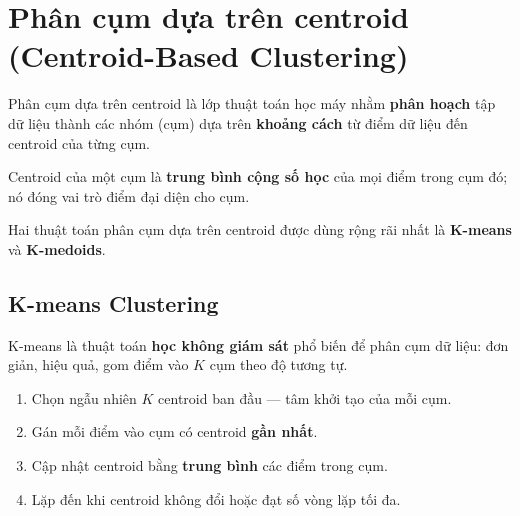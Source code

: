 \section{Phân cụm dựa trên centroid (Centroid-Based Clustering)}
\label{sec:centroid-based}

\begin{dinhnghia}[title={Phân cụm dựa trên centroid}]
Phân cụm dựa trên centroid là lớp thuật toán học máy nhằm \textbf{phân hoạch} tập dữ liệu thành các nhóm (cụm) dựa trên \textbf{khoảng cách} từ điểm dữ liệu đến centroid của từng cụm.
\end{dinhnghia}

\begin{ynghia}[title={Centroid là gì?}]
Centroid của một cụm là \textbf{trung bình cộng số học} của mọi điểm trong cụm đó; nó đóng vai trò điểm đại diện cho cụm.
\end{ynghia}

\begin{phuongphap}[title={Hai thuật toán phổ biến nhất}]
Hai thuật toán phân cụm dựa trên centroid được dùng rộng rãi nhất là \textbf{K-means} và \textbf{K-medoids}.
\end{phuongphap}

\subsection{K-means Clustering}

\begin{dinhnghia}[title={K-means}]
K-means là thuật toán \textbf{học không giám sát} phổ biến để phân cụm dữ liệu: đơn giản, hiệu quả, gom điểm vào $K$ cụm theo độ tương tự.
\end{dinhnghia}

\begin{phuongphap}[title={Cơ chế tóm tắt}]
\begin{enumerate}
  \item Chọn ngẫu nhiên $K$ centroid ban đầu --- tâm khởi tạo của mỗi cụm.
  \item Gán mỗi điểm vào cụm có centroid \textbf{gần nhất}.
  \item Cập nhật centroid bằng \textbf{trung bình} các điểm trong cụm.
  \item Lặp đến khi centroid không đổi hoặc đạt số vòng lặp tối đa.
\end{enumerate}
\end{phuongphap}

